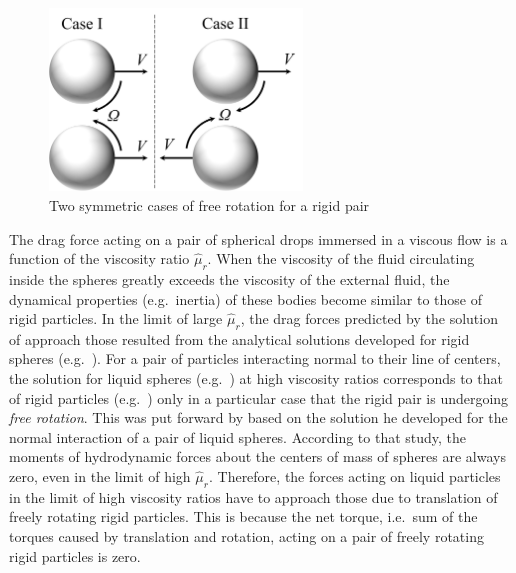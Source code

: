 \documentclass[../thesis.tex]{subfiles}
\begin{document}
\begin{figure}
\center
\includegraphics[trim=0mm 0mm 0mm 0mm, clip, width=0.6\textwidth]{../figs/PRF/fig2.png}
\caption{Two symmetric cases of free rotation for a rigid pair}
\label{fig:freerot}
\end{figure}
The drag force acting on a pair of spherical drops immersed in a viscous flow is a function of the viscosity ratio $\hat{\mu}_r$. When the viscosity of the fluid circulating inside the spheres greatly exceeds the viscosity of the external fluid, the dynamical properties (e.g.\ inertia) of these bodies become similar to those of rigid particles. In the limit of large $\hat{\mu}_r$, the drag forces predicted by the solution of \cite{WW72} approach those resulted from the analytical solutions developed for rigid spheres (e.g.\ \cite{SJ26}). For a pair of particles interacting normal to their line of centers, the solution for liquid spheres (e.g.\ \cite{Z80}) at high viscosity ratios corresponds to that of rigid particles (e.g.\ \cite{ONM70}) only in a particular case that the rigid pair is undergoing \textit{free rotation}. This was put forward by \cite{Z80} based on the solution he developed for the normal interaction of a pair of liquid spheres. According to that study, the moments of hydrodynamic forces about the centers of mass of spheres are always zero, even in the limit of high $\hat{\mu}_r$. Therefore, the forces acting on liquid particles in the limit of high viscosity ratios have to approach those due to translation of freely rotating rigid particles. This is because the net torque, i.e.\ sum of the torques caused by translation and rotation, acting on a pair of freely rotating rigid particles is zero.
\end{document}

